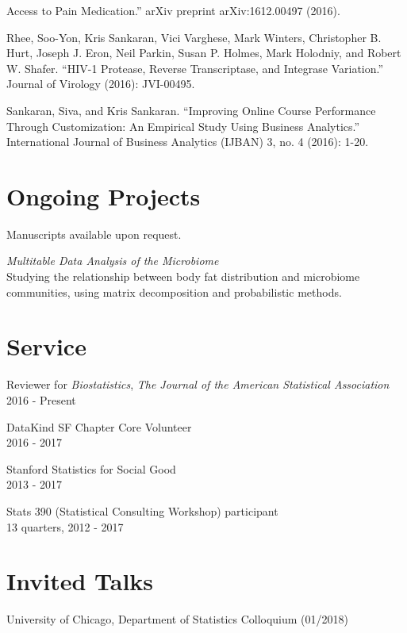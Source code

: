 \documentclass[letterpaper]{article}
\renewenvironment{itemize}{
  \begin{list}{}{
    \setlength{\leftmargin}{1.5em}
  }
}{
  \end{list}
}
\begin{document}
\begin{itemize}
\begin{itemize}
    Access to Pain Medication.'' arXiv preprint arXiv:1612.00497 (2016).
  \item Rhee, Soo-Yon, Kris Sankaran, Vici Varghese, Mark Winters, Christopher B.
    Hurt, Joseph J. Eron, Neil Parkin, Susan P. Holmes, Mark Holodniy, and Robert
    W. Shafer. ``HIV-1 Protease, Reverse Transcriptase, and Integrase Variation.''
    Journal of Virology (2016): JVI-00495.
  \item Sankaran, Siva, and Kris Sankaran. ``Improving Online Course Performance
    Through Customization: An Empirical Study Using Business Analytics.''
    International Journal of Business Analytics (IJBAN) 3, no. 4 (2016): 1-20.
  \end{itemize}
\end{itemize}

\section*{Ongoing Projects}
Manuscripts available upon request.
\begin{itemize}
  \item \textit{Multitable Data Analysis of the Microbiome} \\
    Studying the relationship between body fat distribution and microbiome
    communities, using matrix decomposition and probabilistic methods.
\end{itemize}

\section*{Service}

\begin{itemize}
\item Reviewer for \textit{Biostatistics}, \textit{The Journal of the American Statistical Association} \\
  2016 - Present
\item DataKind SF Chapter Core Volunteer \\
  2016 - 2017
\item Stanford Statistics for Social Good \\
  2013 - 2017
\item Stats 390 (Statistical Consulting Workshop) participant \\
  13 quarters, 2012 - 2017
\end{itemize}

\section*{Invited Talks}
\begin{itemize}
  \item University of Chicago, Department of Statistics Colloquium (01/2018)
\end{itemize}
\end{document}
